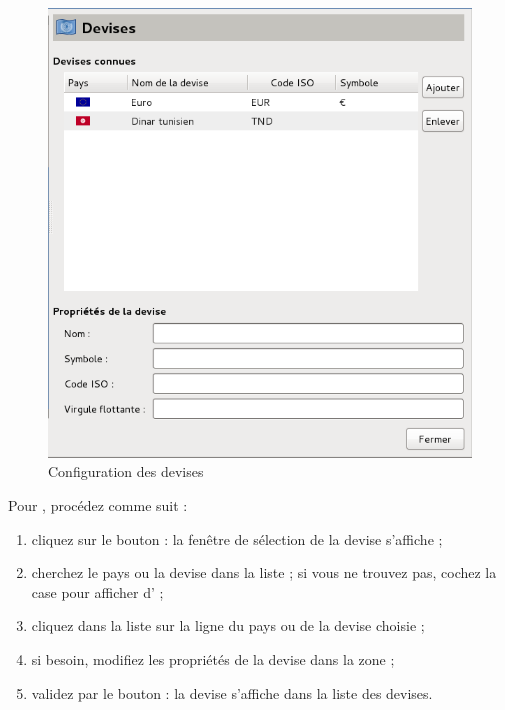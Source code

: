 \ifIllustration
\begin{figure}[ht]
\begin{center}
\includegraphics[scale=0.5]{image/screenshot/setup_currencies}
\end{center}
\caption{Configuration des devises}
\label{setup-currencies-img}
\end{figure}
\fi


\ifIllustration
\else
\fi
Pour , procédez comme suit :

\begin{enumerate}
	\item cliquez sur le bouton  : la fenêtre de sélection de la devise s'affiche ;
	\item cherchez le pays ou la devise dans la liste ; si vous ne trouvez pas, cochez la case  pour afficher d' ;
	\item cliquez dans la liste sur la ligne du pays ou de la devise choisie ;
	\item  si besoin, modifiez les propriétés de la devise dans la zone  ;
	\item validez par le bouton  : la devise s'affiche dans la liste des devises.
\end{enumerate}

